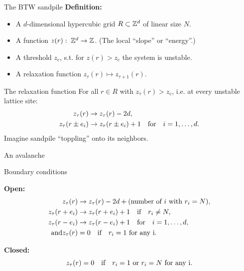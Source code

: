 \begin{frame}{The BTW sandpile}
    \textbf{Definition:}

    \begin{itemize}
        \item A $d$-dimensional hypercubic grid $R\subset\mathbb{Z}^d$ of linear size $N$.
        \item A function $z(r):\; \mathbb{Z}^d \to \mathbb{Z}$. (The local \enquote{slope} or \enquote{energy}.)
        \item A threshold $z_c$, s.t. for $z(r)>z_c$ the system is unstable.
        \item A relaxation function $z_\tau(r)\mapsto z_{\tau+1}(r)$.
    \end{itemize}
\end{frame}


\begin{frame}{The relaxation function}
    For all $r\in R$ with $z_\tau(r) > z_c$, i.e. at every unstable lattice site:
    \begin{align*}
        z_\tau(r) &\to z_\tau(r) - 2d, \\
        z_\tau(r\pm e_i) &\to z_\tau(r\pm e_i) + 1 \qq{for} i=1,\ldots,d.
    \end{align*}
    Imagine sandpile \enquote{toppling} onto its neighbors.
\end{frame}


\begin{frame}{An avalanche}
    \centering
\end{frame}


\begin{frame}{Boundary conditions}

    \textbf{Open:}
    \begin{align*}
        z_\tau(r) &\to z_\tau(r) - 2d + (\text{number of }i\text{ with }r_i=N), \\
        z_\tau(r+e_i) &\to z_\tau(r+e_i) + 1 \qq{if} r_i\neq N, \\
        z_\tau(r-e_i) &\to z_\tau(r-e_i) + 1 \qq{for} i=1,\ldots,d, \\
        \text{and} z_\tau(r) &= 0 \qq{if} r_i=1 \text{ for any i}.
    \end{align*} \pause

    \textbf{Closed:}
    \begin{equation*}
        z_\tau(r) = 0 \qq{if} r_i=1\text{ or } r_i=N \text{ for any i}.
    \end{equation*}

\end{frame}


